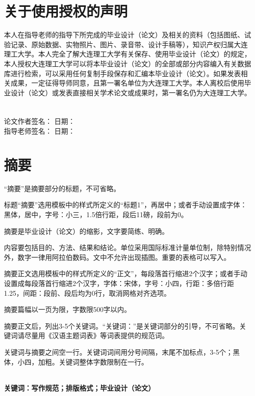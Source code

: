 \documentclass[UTF8,a4paper]{ctexart}
\numberwithin{table}{section}
\numberwithin{equation}{section}
\begin{document}
	\section*{\fontsize{15}{22.5} {\heiti 关于使用授权的声明}}
	本人在指导老师的指导下所完成的毕业设计（论文）及相关的资料（包括图纸、试验记录、原始数据、实物照片、图片、录音带、设计手稿等），知识产权归属大连理工大学。本人完全了解大连理工大学有关保存、使用毕业设计（论文）的规定，本人授权大连理工大学可以将本毕业设计（论文）的全部或部分内容编入有关数据库进行检索，可以采用任何复制手段保存和汇编本毕业设计（论文）。如果发表相关成果，一定征得导师同意，且第一署名单位为大连理工大学。本人离校后使用毕业设计（论文）或发表直接相关学术论文或成果时，第一署名仍为大连理工大学。
	~\\
	~\\
	论文作者签名： \quad \quad \quad \quad \quad \quad 日\quad 期：\\
	指导老师签名： \quad \quad \quad \quad \quad \quad 日\quad 期：
	\newpage
	\section*{\fontsize{15}{22.5} {\heiti 摘\quad\quad 要}}
	“摘要”是摘要部分的标题，不可省略。\par 
	标题“摘要”选用模板中的样式所定义的“标题1”，再居中；或者手动设置成字体：黑体，居中，字号：小三，1.5倍行距，段后11磅，段前为0。\par 
	摘要是毕业设计（论文）的缩影，文字要简练、明确。\par 
	内容要包括目的、方法、结果和结论。单位采用国际标准计量单位制，除特别情况外，数字一律用阿拉伯数码。文中不允许出现插图。重要的表格可以写入。\par 
	摘要正文选用模板中的样式所定义的“正文”，每段落首行缩进2个汉字；或者手动设置成每段落首行缩进2个汉字，字体：宋体，字号：小四，行距：多倍行距 1.25，间距：段前、段后均为0行，取消网格对齐选项。\par 
	摘要篇幅以一页为限，字数限500字以内。\par 
	摘要正文后，列出3-5个关键词。“关键词：”是关键词部分的引导，不可省略。关键词请尽量用《汉语主题词表》等词表提供的规范词。\par 
	关键词与摘要之间空一行。关键词词间用分号间隔，末尾不加标点，3-5个；黑体，小四，加粗。关键词整体字数限制在一行。\par 
	\quad \\
	{\bf{\heiti 关键词：写作规范；排版格式；毕业设计（论文）}}
	
\end{document}
